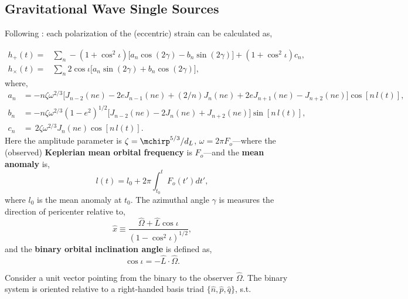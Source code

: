 \documentclass[10pt, oneside, onecolumn]{article}   	%
\begin{document}

    \subsection{Gravitational Wave Single Sources}
    \label{sec:gw_singles_calc}

    Following \citet{taylor201505}: each polarization of the (eccentric) strain can be calculated as,

    \begin{align}
    \label{eq:}
    h_{+}(t) = & \sum_n - (1 + \cos^2 \iota) \Big[ a_n \cos(2\gamma) - b_n \sin(2\gamma)\Big] + (1+\cos^2 \iota) c_n, \nonumber \\
    h_{\times}(t) = & \sum_n 2\cos \iota \Big[a_n \sin(2\gamma) + b_n \cos(2\gamma)\Big],
    \end{align}
    where,
    \begin{align}
    \label{eq:}
    a_n & = -n\zeta \omega^{2/3}\bigg[J_{n-2}(ne) - 2eJ_{n-1}(ne) + (2/n)J_n(ne) + 2 e J_{n+1}(ne) - J_{n+2}(ne)\bigg]\cos\left[n \, l(t)\right], \nonumber \\
    b_n & = -n\zeta \omega^{2/3} (1 - e^2)^{1/2}\bigg[J_{n-2}(ne) - 2J_n (ne) + J_{n+2}(ne)\bigg]\sin\left[n \, l(t)\right], \\
    c_n & = \, 2 \zeta \omega^{2/3} J_n (ne)\cos\left[n \, l (t)\right]. \nonumber
    \end{align}
    Here the amplitude parameter is $\zeta = \mchirp^{5/3} / d_L$, $\omega = 2 \pi F_o$---where the (observed) \textbf{Keplerian mean orbital frequency} is $F_o$---and the \textbf{mean anomaly} is,
    \begin{equation}
    l(t) = l_0 + 2\pi \int_{t_0}^{t} F_o(t') dt',
    \end{equation}
    where $l_0$ is the mean anomaly at $t_0$.  The azimuthal angle $\gamma$ is measures the direction of pericenter relative to,
    \begin{equation}
    \hat{x} \equiv \frac{\hat{\Omega} + \hat{L} \cos \iota}{\left(1 - \cos^2 \iota\right)^{1/2}},
    \end{equation}
    and the \textbf{binary orbital inclination angle} is defined as,
    \begin{equation}
    \cos \iota = - \hat{L} \cdot \hat{\Omega}.
    \end{equation}

    Consider a unit vector pointing from the binary to the observer $\hat{\Omega}$.  The binary system is oriented relative to a right-handed basis triad $\{\hat{n}, \hat{p}, \hat{q}\}$, s.t.
\end{document}
